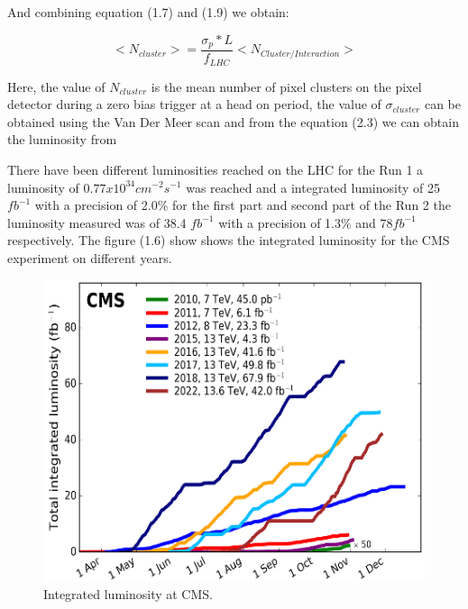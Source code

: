 And combining equation (1.7) and (1.9) we obtain:

\begin{equation}
<N_{cluster}> = \frac{\sigma_{p}* L}{f_{LHC}}  <N_{Cluster/Interaction}>
\end{equation}

Here, the value of $N_{cluster}$ is the mean number of pixel clusters on the pixel detector during a zero bias trigger at a head on period, the value of $\sigma_{cluster}$ can be obtained using the Van Der Meer scan and from the equation (2.3) we can obtain the luminosity from \cite{PCC2}


There have been different luminosities reached on the LHC for the Run 1 a luminosity of $0.77 x 10^{34} cm^{-2} s^{-1}$ was reached and a integrated luminosity of 25 $fb^{-1}$  with a precision of 2.0\% for the first part and second part of the Run 2 the luminosity measured was of 38.4 $fb^{-1}$ with a precision of 1.3\% and 78$fb^{-1}$ respectively\cite{LHClum}.  The figure (1.6) show shows the integrated luminosity for the CMS experiment on different years.  

\begin{figure}[h]
    \centering
     \includegraphics[scale=1.25]{integratedlum.png}
     \caption{Integrated luminosity at CMS.}
    \label{fig:CMS-Luminosity}
\end{figure}

